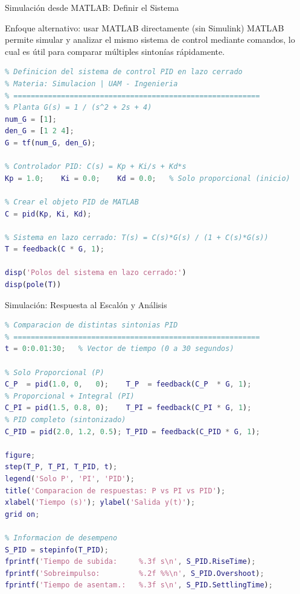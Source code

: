 \documentclass[aspectratio=169,xcolor=dvipsnames]{beamer}
\begin{document}
\begin{frame}[fragile]{Simulación desde MATLAB: Definir el Sistema}
    \begin{block}{Enfoque alternativo: usar MATLAB directamente (sin Simulink)}
        MATLAB permite simular y analizar el mismo sistema de control mediante comandos, lo cual es útil para comparar múltiples sintonías rápidamente.
    \end{block}
    \vspace{0.3em}
\begin{lstlisting}[language=Matlab, style=MATLABStyle]
% =========================================================
% Definicion del sistema de control PID en lazo cerrado
% Materia: Simulacion | UAM - Ingenieria
% =========================================================
% Planta G(s) = 1 / (s^2 + 2s + 4)
num_G = [1];
den_G = [1 2 4];
G = tf(num_G, den_G);

% Controlador PID: C(s) = Kp + Ki/s + Kd*s
Kp = 1.0;    Ki = 0.0;    Kd = 0.0;   % Solo proporcional (inicio)

% Crear el objeto PID de MATLAB
C = pid(Kp, Ki, Kd);

% Sistema en lazo cerrado: T(s) = C(s)*G(s) / (1 + C(s)*G(s))
T = feedback(C * G, 1);

disp('Polos del sistema en lazo cerrado:')
disp(pole(T))
\end{lstlisting}
\end{frame}

\begin{frame}[fragile]{Simulación: Respuesta al Escalón y Análisis}
\begin{lstlisting}[language=Matlab, style=MATLABStyle]
% =========================================================
% Comparacion de distintas sintonias PID
% =========================================================
t = 0:0.01:30;   % Vector de tiempo (0 a 30 segundos)

% Solo Proporcional (P)
C_P  = pid(1.0, 0,   0);    T_P  = feedback(C_P  * G, 1);
% Proporcional + Integral (PI)
C_PI = pid(1.5, 0.8, 0);    T_PI = feedback(C_PI * G, 1);
% PID completo (sintonizado)
C_PID = pid(2.0, 1.2, 0.5); T_PID = feedback(C_PID * G, 1);

figure;
step(T_P, T_PI, T_PID, t);
legend('Solo P', 'PI', 'PID');
title('Comparacion de respuestas: P vs PI vs PID');
xlabel('Tiempo (s)'); ylabel('Salida y(t)');
grid on;

% Informacion de desempeno
S_PID = stepinfo(T_PID);
fprintf('Tiempo de subida:     %.3f s\n', S_PID.RiseTime);
fprintf('Sobreimpulso:         %.2f %%\n', S_PID.Overshoot);
fprintf('Tiempo de asentam.:   %.3f s\n', S_PID.SettlingTime);
\end{lstlisting}
\end{frame}
\end{document}
